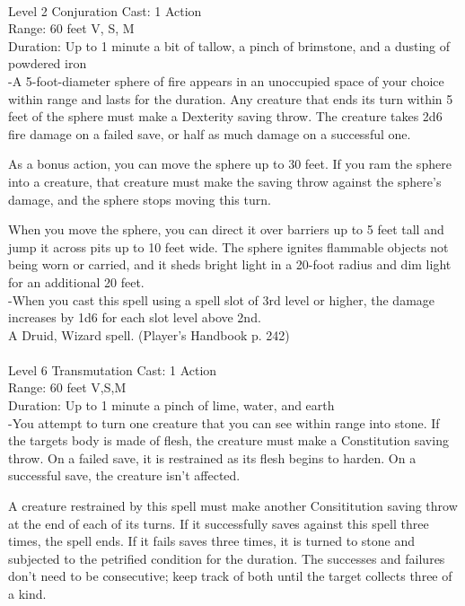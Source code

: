 \documentclass[10pt,twocolumn]{report}
\begin{document}
 \\
Level 2 \quad Conjuration \quad Cast: 1 Action\\
Range: 60 feet \quad V, S, M\\
Duration: Up to 1 minute \quad a bit of tallow, a pinch of brimstone, and a dusting of powdered iron\\
-A 5-foot-diameter sphere of fire appears in an unoccupied space of your choice within range and lasts for the duration. 
Any creature that ends its turn within 5 feet of the sphere must make a Dexterity saving throw. The creature takes 2d6 fire damage on a failed save, or half as much damage on a successful one.

As a bonus action, you can move the sphere up to 30 feet. If you ram the sphere into a creature, that creature must make the saving throw against the sphere’s damage, and the sphere stops moving this turn.

When you move the sphere, you can direct it over barriers up to 5 feet tall and jump it across pits up to 10 feet wide. The sphere ignites flammable objects not being worn or carried, and it sheds bright light in a 20-foot radius and dim light for an additional 20 feet.\\
-When you cast this spell using a spell slot of 3rd level or higher, the damage increases by 1d6 for each slot level above 2nd.\\
A Druid, Wizard spell. (Player's Handbook p. 242) \\


 \\
Level 6 \quad Transmutation \quad Cast: 1 Action\\
Range: 60 feet \quad V,S,M\\
Duration: Up to 1 minute \quad a pinch of lime, water, and earth\\
-You attempt to turn one creature that you can see within range into stone.
If the targets body is made of flesh, the creature must make a Constitution saving throw. On a failed save, it is restrained as its flesh begins to harden. On a successful save, the creature isn’t affected.

A creature restrained by this spell must make another Consititution saving throw at the end of each of its turns. If it successfully saves against this spell three times, the spell ends. If it fails saves three times, it is turned to stone and subjected to the petrified condition for the duration. The successes and failures don’t need to be consecutive; keep track of both until the target collects three of a kind.
\end{document}
